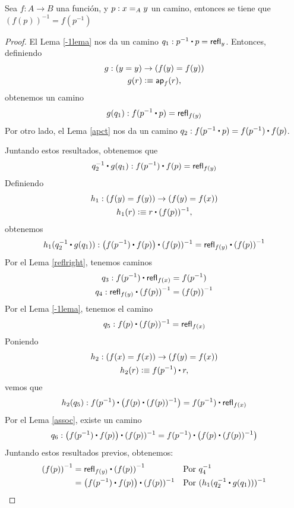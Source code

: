 \documentclass[../main.tex]{subfiles}
\begin{document}
\begin{lemma}
  Sea $f:A \to B$ una funci\'on, y $p:\id[A]{x}{y}$ un camino, entonces se tiene que $(f(p))^{-1}=f(p^{-1})$
\end{lemma}
\begin{proof}
  El Lema \ref{-1lema} nos da un camino $q_1:p^{-1} \ct p = \refl{y}$. Entonces, definiendo
  \begin{gather*}
    g:(y=y) \to (f(y)=f(y)) \\
    g(r)\defeq \apfunc f (r),
  \end{gather*}
  obtenemos un camino $$g(q_1): f(p^{-1} \ct p) = \refl{f(y)}$$
  Por otro lado, el Lema \ref{apct} nos da un camino $q_2: f(p^{-1} \ct p) = f(p^{-1}) \ct f(p)$.

  Juntando estos resultados, obtenemos que
  $$q_2^{-1} \ct g(q_1) : f(p^{-1}) \ct f(p) = \refl{f(y)}$$
  Definiendo
  \begin{gather*}
    h_1:(f(y)=f(y))\to (f(y)=f(x)) \\
    h_1(r)\defeq r \ct (f(p))^{-1},
  \end{gather*}
  obtenemos
  $$h_1(q_2^{-1} \ct g(q_1)) : \left(f(p^{-1}) \ct f(p)\right) \ct (f(p))^{-1}= \refl{f(y)}\ct \left(f(p)\right)^{-1}$$
  Por el Lema \ref{reflright}, tenemos caminos
  \begin{gather*}
    q_3: f(p^{-1}) \ct \refl{f(x)} = f(p^{-1})\\
    q_4:\refl{f(y)}\ct \left(f(p)\right)^{-1} = \left(f(p)\right)^{-1}
  \end{gather*}
  Por el Lema \ref{-1lema}, tenemos el camino
  \[ q_5:f(p) \ct (f(p))^{-1} = \refl{f(x)}\]
  Poniendo
  \begin{gather*}
    h_2:(f(x)=f(x))\to (f(y)=f(x)) \\
    h_2(r)\defeq f(p^{-1}) \ct r,
  \end{gather*}
  vemos que
  \[ h_2(q_5) : f(p^{-1}) \ct\left( f(p) \ct (f(p))^{-1} \right)= f(p^{-1}) \ct\refl{f(x)}\]
  Por el Lema \ref{assoc}, existe un camino
  \[q_6:\left(f(p^{-1}) \ct f(p)\right) \ct (f(p))^{-1}= f(p^{-1}) \ct \left( f(p) \ct (f(p))^{-1}\right)\]
  Juntando estos resultados previos, obtenemos:
  \begin{align*}
    \left(f(p)\right)^{-1}                  &
    = \refl{f(y)}\ct \left(f(p)\right)^{-1} &                                                    & \text{Por $q_4^{-1}$}                                                \\
                                            & = \left(f(p^{-1}) \ct f(p)\right) \ct (f(p))^{-1}  &                       & \text{Por $(h_1(q_2^{-1} \ct g(q_1)))^{-1}$} \\

\end{align*}
\end{proof}
\end{document}
